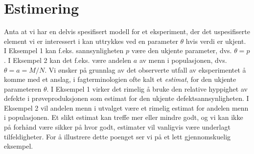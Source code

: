 \section{Estimering}
Anta at vi har en delvis spesifisert modell for et eksperiment,
der det uspesifiserte element vi er interessert i kan uttrykkes
ved en parameter $\theta$ hvis verdi er ukjent. I Eksempel 1 kan
f.eks. sannsynligheten $p$ være den ukjente parameter, dvs.
$\theta =p$. I Eksempel 2 kan det f.eks. være andelen $a$ av
menn i populasjonen, dvs. $\theta =a=M/N$. Vi ønsker på grunnlag
av det observerte utfall av eksperimentet å komme med et anslag,
i fagterminologien ofte kalt et {\em estimat}, for den ukjente
parameteren $\theta$. I Eksempel 1 virker det rimelig å bruke den
relative hyppighet av defekte i prøveproduksjonen som estimat for
den ukjente defektsannsynligheten. I Eksempel 2 vil andelen menn
i utvalget være et rimelig estimat for andelen menn i
populasjonen. Et slikt estimat kan treffe mer eller mindre godt, og vi
kan ikke på forhånd være sikker på hvor godt, estimater vil
vanligvis være underlagt tilfeldigheter. For å illustrere dette
poenget ser vi på et lett gjennomskuelig eksempel. \\

